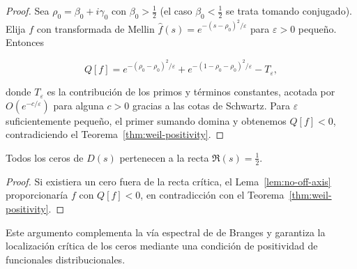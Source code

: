 \begin{proof}
Sea $\rho_0=\beta_0+i\gamma_0$ con $\beta_0>\tfrac{1}{2}$ (el caso $\beta_0<\tfrac{1}{2}$
se trata tomando conjugado).  Elija $f$ con transformada de Mellin
$\widehat{f}(s)=e^{-(s-\rho_0)^2/\varepsilon}$ para $\varepsilon>0$ pequeño.  Entonces

\[
  Q[f]=e^{-(\rho_0-\rho_0)^2/\varepsilon}
        +e^{-(1-\rho_0-\rho_0)^2/\varepsilon}
        -T_\varepsilon,
\]

donde $T_\varepsilon$ es la contribución de los primos y términos constantes,
acotada por $O(e^{-c/\varepsilon})$ para alguna $c>0$ gracias a las cotas de
Schwartz.  Para $\varepsilon$ suficientemente pequeño, el primer sumando domina y
obtenemos $Q[f]<0$, contradiciendo el Teorema~\ref{thm:weil-positivity}.
\end{proof}

\begin{corollary}
Todos los ceros de $D(s)$ pertenecen a la recta $\Re(s)=\tfrac{1}{2}$.
\end{corollary}

\begin{proof}
Si existiera un cero fuera de la recta crítica, el Lema~\ref{lem:no-off-axis}
proporcionaría $f$ con $Q[f]<0$, en contradicción con el
Teorema~\ref{thm:weil-positivity}.
\end{proof}

Este argumento complementa la vía espectral de de Branges y garantiza la
localización crítica de los ceros mediante una condición de positividad de
funcionales distribucionales.
